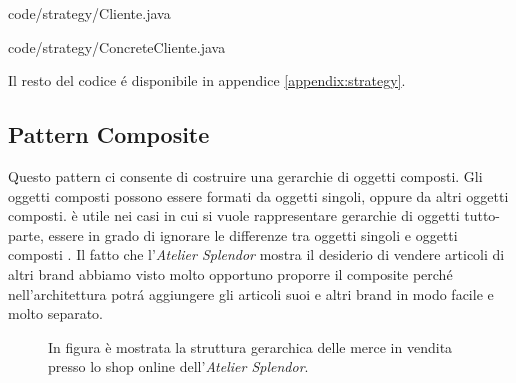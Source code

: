 \documentclass[12pt]{article}
\begin{document}

{code/strategy/Cliente.java}


{code/strategy/ConcreteCliente.java}

Il resto del codice \'e disponibile in appendice \ref{appendix:strategy}.


\subsection{Pattern Composite}

Questo pattern ci consente di costruire una gerarchie di oggetti composti. Gli oggetti composti possono essere formati da oggetti singoli, oppure da altri oggetti composti. è utile nei casi in cui si vuole rappresentare gerarchie di oggetti tutto-parte, essere in grado di ignorare le differenze tra oggetti singoli e oggetti composti \cite{gof_riferimento}.
Il fatto che l'{\em Atelier Splendor} mostra il desiderio di vendere articoli di altri brand abbiamo visto molto opportuno proporre il composite perch\'e nell'architettura potr\'a aggiungere gli articoli suoi e altri brand in modo facile e molto separato.

\begin{figure}[!t]
    \centering
  \caption{\small In figura è mostrata la struttura gerarchica delle merce in vendita presso lo shop online dell'{\em Atelier Splendor}.}
  \label{fig:diagram_composite}
\end{figure}
\end{document}

